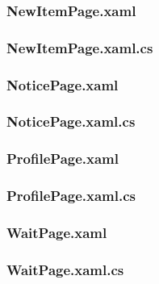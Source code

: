 \documentclass{../includes/TechDoc}
\begin{document}
    \subsubsection{NewItemPage.xaml}
    

    \subsubsection{NewItemPage.xaml.cs}
    

    \subsubsection{NoticePage.xaml}
    

    \subsubsection{NoticePage.xaml.cs}
    

    \subsubsection{ProfilePage.xaml}
    

    \subsubsection{ProfilePage.xaml.cs}
    

    \subsubsection{WaitPage.xaml}
    

    \subsubsection{WaitPage.xaml.cs}
    
\end{document}
